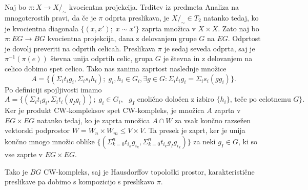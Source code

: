\documentclass[a4paper, 12pt]{article}
\begin{document}
\begin{enumerate}[label=(\alph*)]
	Naj bo $\pi\colon X \to X/_\sim$ kvocientna projekcija. Trditev iz predmeta Analiza na mnogoterostih pravi, da če je $\pi$ odprta preslikava, je $X/_\sim \in T_2$ natanko tedaj, ko je kvocientna diagonala $\lbrace (x, x') ; \; x \sim x' \rbrace$ zaprta množica v $X \times X$. Zato naj bo $\pi \colon EG \to BG$ kvocientna projekcija, dana z delovanjem grupe $G$ na $EG$. Odprtost je dovolj preveriti na odprtih celicah. Preslikava $\pi$ je sedaj seveda odprta, saj je $\pi^{-1}(\pi(e))$ števna unija odprtih celic, grupa $G$ je števna in z delovanjem na celico dobimo spet celico. Tako nas zanima zaprtost naslednje množice
	\[
	A = \lbrace (\Sigma_i t_ig_i, \Sigma_i s_ih_i) ; \; g_i, h_i \in G_i,  \exists g \in G: \Sigma_i t_ig_i = \Sigma_i s_i(gg_i) \rbrace.
	\]
	Po definiciji spojljivosti imamo
	\[
	A = \lbrace (\Sigma_i t_ig_i, \Sigma_i t_i (g_I g_i)) ; \; g_i \in G_i, \text{ $g_I$ enolično določen z izbiro $\lbrace h_i \rbrace$, teče po celotnemu $G$} \rbrace.
	\]
	Ker je produkt CW-kompleksov spet CW-kompleks, je množica $A$ zaprta v $EG\times EG$ natanko tedaj, ko je zaprta množica $A \cap W$ za vsak končno razsežen vektorski podprostor $W = W_n \times W_m \leq V \times V$. Ta presek je zaprt, ker je unija končno mnogo množic oblike $\lbrace (\Sigma_{k=0}^n t_{i_k}g_{i_k}, \Sigma_{k=0}^n t_{i_k}g_Ig_{i_k})\rbrace$ za neki $g_I \in G$, ki so vse zaprte v $EG \times EG$.
	
	Tako je $BG$ CW-kompleks, saj je Hausdorffov topološki prostor, karakteristične preslikave pa dobimo s kompozicijo s preslikavo $\pi$.
	
\end{enumerate}
\end{document}
